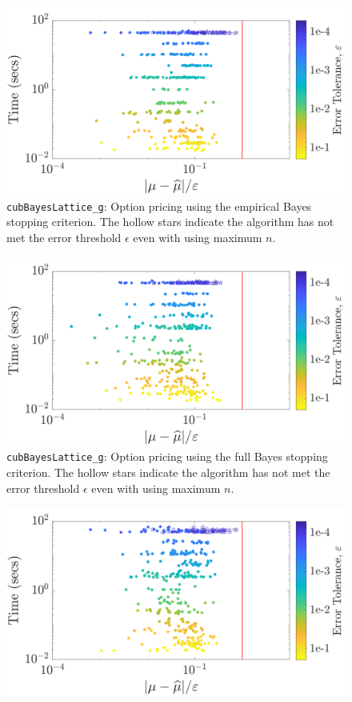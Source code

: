 \documentclass{iitthesis}          %
\newcommand{\code}[1]{\texttt{#1}}
\begin{document}
{{{{{{\label{sec:cubBayesLattice_option_pricing_example}
\begin{figure}
	\centering
	\includegraphics[width=0.95\linewidth]{"Lattice/Lattice_optPrice_guaranteed_time_MLE_Baker_d12_r1_2019-Jul-9"}
	\caption[Lattice: Option pricing guaranteed: MLE]{\code{cubBayesLattice\_g}: Option pricing using the empirical Bayes stopping criterion. The hollow stars indicate the algorithm has not met the error threshold $\epsilon$ even with using maximum $n$. }
	\label{fig:optprice-guaranteed-MLE}
\end{figure}
\begin{figure}
	\centering
	\includegraphics[width=0.95\linewidth]{"Lattice/Lattice_optPrice_guaranteed_time_full_Baker_d12_r1_2019-Jul-9"}
	\caption[Lattice: Option pricing guaranteed: Full Bayes]{\code{cubBayesLattice\_g}: Option pricing using the full Bayes stopping criterion. The hollow stars indicate the algorithm has not met the error threshold $\epsilon$ even with using maximum $n$.}
	\label{fig:optprice-guaranteed-FB}
\end{figure}
\begin{figure}
	\centering
	\includegraphics[width=0.95\linewidth]{"Lattice/Lattice_optPrice_guaranteed_time_GCV_Baker_d12_r1_2019-Jul-8"}

\end{figure}}}}}}}
\end{document}
